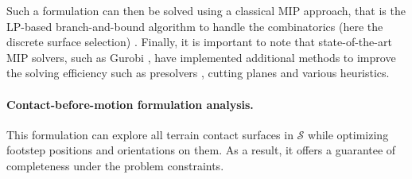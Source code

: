 Such a formulation can then be solved using a classical MIP approach, that is the LP-based branch-and-bound algorithm to handle the combinatorics (here the discrete surface selection) \cite{gurobi_mip}.
Finally, it is important to note that state-of-the-art MIP solvers, such as Gurobi \cite{gurobi}, have implemented additional methods to improve the solving efficiency such as presolvers \cite{presolve_gurobi_2020}, cutting planes \cite{cutting_plan_gomory_1996} and various heuristics. 


\paragraph{Contact-before-motion formulation analysis.}
This formulation can explore all terrain contact surfaces in $\mathcal{S}$ while optimizing footstep positions and orientations on them.
As a result, it offers a guarantee of completeness under the problem constraints.

